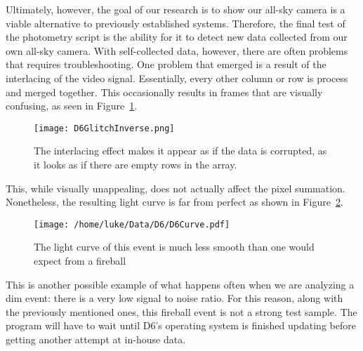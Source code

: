 Ultimately, however, the goal of our research is to show our all-sky camera is a viable alternative to previously established systems. Therefore, the final test of the photometry script is the ability for it to detect new data collected from our own all-sky camera. With self-collected data, however, there are often problems that requires troubleshooting. One problem that emerged is a result of the interlacing of the video signal. Essentially, every other column or row is process and merged together. This occasionally results in frames that are visually confusing, as seen in Figure~\ref{fig:D6Glitch}. 
\begin{figure}[ht!]
	\centering
	\texttt{[image: D6GlitchInverse.png]}
	\caption{The interlacing effect makes it appear as if the data is corrupted, as it looks as if there are empty rows in the array.}
	\label{fig:D6Glitch}
\end{figure}
This, while visually unappealing, does not actually affect the pixel summation. Nonetheless, the resulting light curve is far from perfect as shown in Figure~\ref{fig:D6LightCurve}.
\begin{figure}[ht!]
	\centering
	\texttt{[image: /home/luke/Data/D6/D6Curve.pdf]}
	\caption{The light curve of this event is much less smooth than one would expect from a fireball}
	\label{fig:D6LightCurve}
\end{figure}

This is another possible example of what happens often when we are analyzing a dim event: there is a very low signal to noise ratio. For this reason, along with the previously mentioned ones, this fireball event is not a strong test sample. The program will have to wait until D6's operating system is finished updating before getting another attempt at in-house data. 
